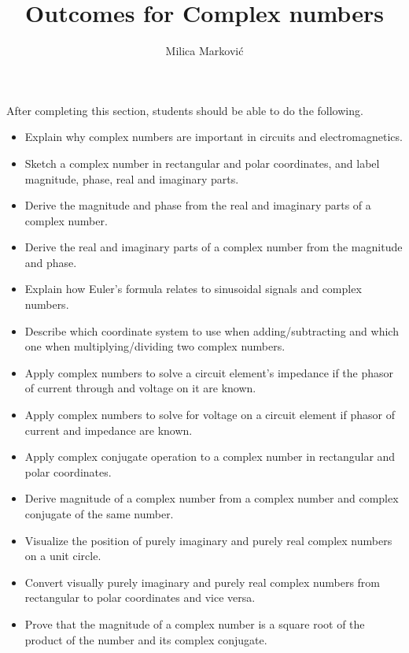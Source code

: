 \documentclass{ximera}
\title{Outcomes for Complex numbers}
\author{Milica Markovi{\'c}}
\begin{document}
\begin{abstract}
\end{abstract}

\maketitle

\begin{sectionOutcomes}

After completing this section, students should be able to do the following.

\begin{itemize}
\item Explain why complex numbers are important in circuits and electromagnetics.
\item Sketch a complex number in rectangular and polar coordinates, and label magnitude, phase, real and imaginary parts.
\item Derive the magnitude and phase from the real and imaginary parts of a complex number.
\item Derive the real and imaginary parts of a complex number from the magnitude and phase.
\item Explain how Euler's formula relates to sinusoidal signals and complex numbers.
\item Describe which coordinate system to use when adding/subtracting and which one when multiplying/dividing two complex numbers.
\item Apply complex numbers to solve a circuit element's impedance if the phasor of current through and voltage on it are known.
\item Apply complex numbers to solve for voltage on a circuit element if phasor of current and impedance are known.
\item Apply complex conjugate operation to a complex number in rectangular and polar coordinates.
\item Derive magnitude of a complex number from a complex number and complex conjugate of the same number.
\item Visualize the position of purely imaginary and purely real complex numbers on a unit circle.
\item Convert visually purely imaginary and purely real complex numbers from rectangular to polar coordinates and vice versa.
\item Prove that the magnitude of a complex number is a square root of the product of the number and its complex conjugate.
\end{itemize}

\end{sectionOutcomes}
\end{document}
